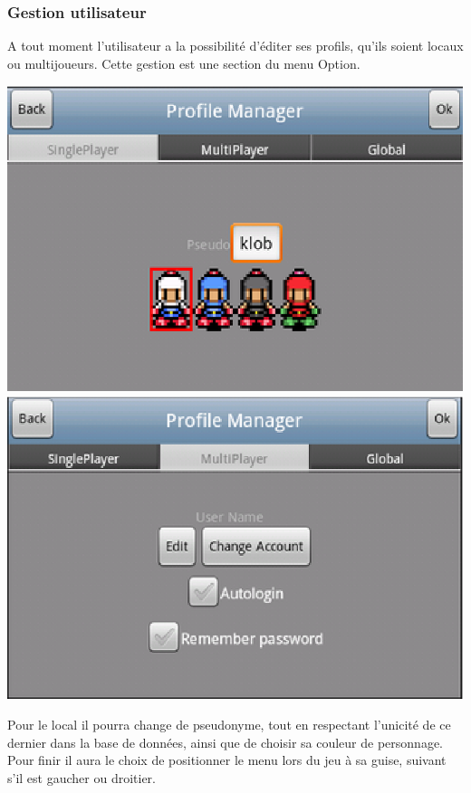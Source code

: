 	\subsubsection{Gestion utilisateur}
	A tout moment l'utilisateur a la possibilité d'éditer ses profils, qu'ils
	soient locaux ou multijoueurs. Cette gestion est une section du menu Option.
		\begin{center}						
			\includegraphics[scale=0.6]{Developpement/Img/5.eps}
			\includegraphics[scale=0.6]{Developpement/Img/6.eps}
		\end{center}
	Pour le local il pourra change de pseudonyme, tout en respectant l'unicité de
	ce dernier dans la base de données, ainsi que de choisir sa couleur de
	personnage. Pour finir il aura le choix de positionner le menu lors du jeu à sa
	guise, suivant s'il est gaucher ou droitier.
	
